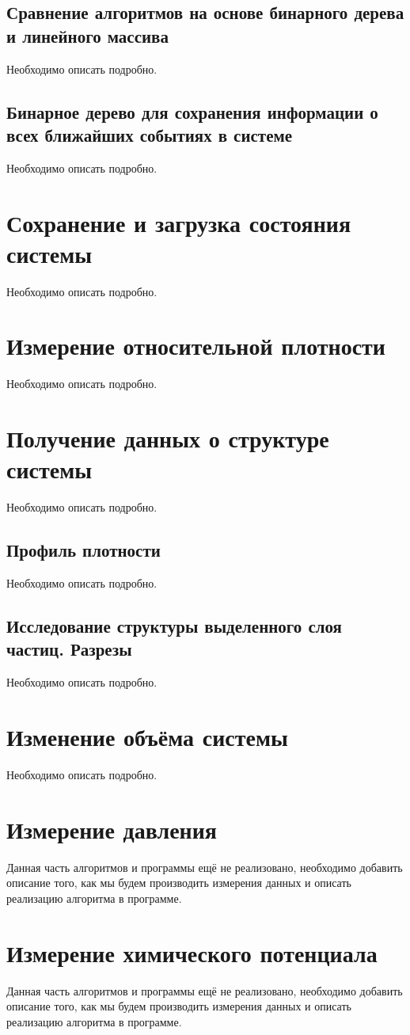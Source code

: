 \documentclass{article}
\begin{document}
\subsection{Сравнение алгоритмов на основе бинарного дерева и линейного массива}
Необходимо описать подробно.
\subsection{Бинарное дерево для сохранения информации о всех ближайших событиях в системе}
Необходимо описать подробно.

\newpage
\section{Сохранение и загрузка состояния системы}
Необходимо описать подробно.

\newpage
\section{Измерение относительной плотности}
Необходимо описать подробно.

\newpage
\section{Получение данных о структуре системы}
Необходимо описать подробно.
\subsection{Профиль плотности}
Необходимо описать подробно.
\subsection{Исследование структуры выделенного слоя частиц. Разрезы}
Необходимо описать подробно.
\newpage
\section{Изменение объёма системы}
Необходимо описать подробно.

\newpage
\section{Измерение давления}
Данная часть алгоритмов и программы ещё не реализовано, необходимо добавить описание того, как мы будем производить измерения данных и описать реализацию алгоритма в программе.

\newpage
\section{Измерение химического потенциала}
Данная часть алгоритмов и программы ещё не реализовано, необходимо добавить описание того, как мы будем производить измерения данных и описать реализацию алгоритма в программе.
\end{document}
